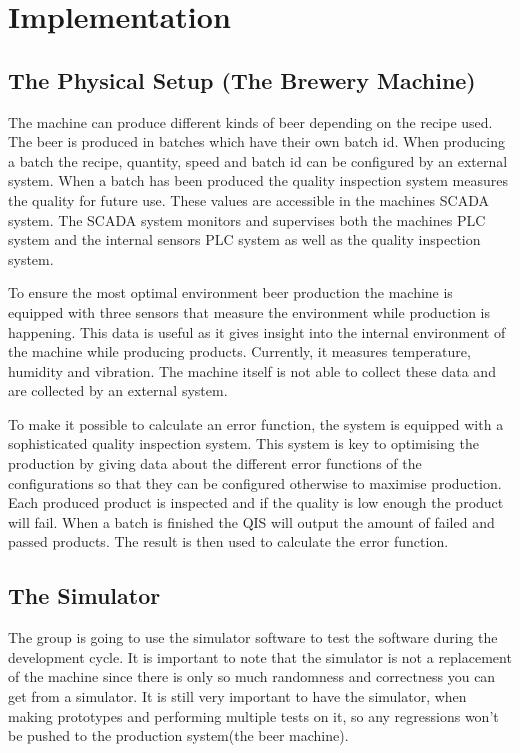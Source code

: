 \section{Implementation}
\subsection{The Physical Setup (The Brewery Machine)}

The machine can produce different kinds of beer depending on the recipe
used. The beer is produced in batches which have their own batch id. When 
producing a batch the recipe, quantity, speed and batch id can be configured by 
an external system. When a batch has been produced the quality inspection system 
measures the quality for future use. These values are accessible in the machines 
SCADA system. The SCADA system monitors and supervises both the machines PLC 
system and the internal sensors PLC system as well as the quality inspection 
system.

To ensure the most optimal environment beer production the 
machine is equipped with three sensors that measure the environment while 
production is happening. This data is useful as it gives insight into the 
internal environment of the machine while producing products. Currently, it 
measures temperature, humidity and vibration. The machine itself is not able to 
collect these data and are collected by an external system.

To make it possible to calculate an error function, the system is 
equipped with a sophisticated quality inspection system. This system is key to 
optimising the production by giving data about the different error functions of 
the configurations so that they can be configured otherwise to maximise 
production. Each produced product is inspected and if the quality is low enough
the product will fail. When a batch is finished the QIS will output the amount 
of failed and passed products. The result is then used to calculate the error
function.


\subsection{The Simulator}
The group is going to use the simulator software to test the software during the
development cycle.
It is important to note that the simulator is not a replacement of the machine
since there is only so much randomness and correctness you can get from a 
simulator. 
It is still very important to have the simulator, when making prototypes and 
performing multiple tests on it, so any regressions won't be pushed to 
the production system(the beer machine).


